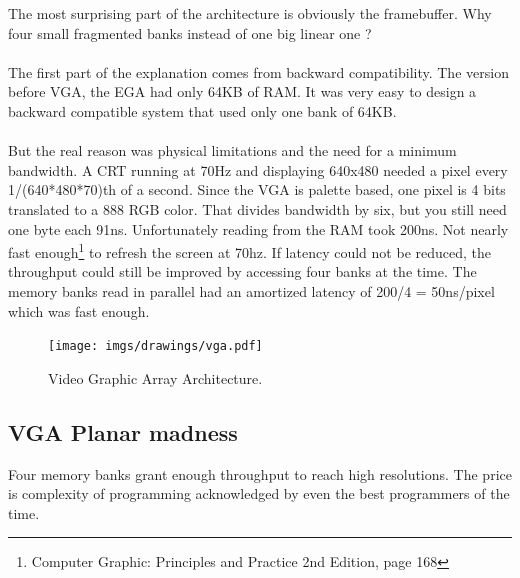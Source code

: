 \documentclass[book.tex]{subfiles}
\begin{document}
The most surprising part of the architecture is obviously the framebuffer. Why four small fragmented banks instead of one big linear one ?\\
\\
The first part of the explanation comes from backward compatibility. The version before VGA, the EGA had only 64KB of RAM. It was very easy to design a backward compatible system that used only one bank of 64KB.\\
\\
But the real reason was physical limitations and the need for a minimum bandwidth. A CRT running at 70Hz and displaying 640x480 needed a pixel every 1/(640*480*70)th of a second. Since the VGA is palette based, one pixel is 4 bits translated to a 888 RGB color. That divides bandwidth by six, but you still need one byte each 91ns. Unfortunately reading from the RAM took 200ns. Not nearly fast enough\footnote{Computer Graphic: Principles and Practice 2nd Edition, page 168} to refresh the screen at 70hz. If latency could not be reduced, the throughput could still be improved by accessing four banks at the time. The memory banks read in parallel had an amortized latency of 200/4 = 50ns/pixel which was fast enough.


\begin{figure}[H]
\centering
\texttt{[image: imgs/drawings/vga.pdf]}
\caption{Video Graphic Array Architecture.}
\label{fig:vga_arch}
\end{figure}




\subsection{VGA Planar madness}

Four memory banks grant enough throughput to reach high resolutions. The price is complexity of programming acknowledged by even the best programmers of the time.\\
\end{document}
